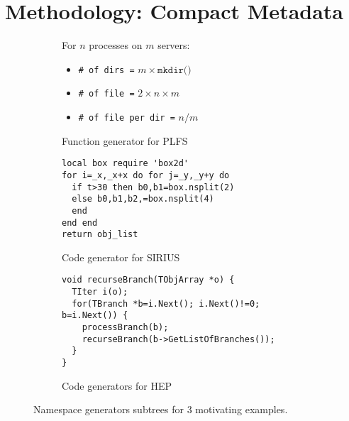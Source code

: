 \section{Methodology: Compact Metadata}


\begin{figure*}[tb]
  \centering
  \begin{subfigure}[b]{0.3\linewidth}
    For \(n\) processes on \(m\) servers:
    \begin{itemize}
      \setlength\itemsep{-0.5em}
      \item[] \texttt{\# of dirs =} \(m \times \texttt{mkdir()}\)
      \item[] \texttt{\# of file =} \(2 \times n \times m\)
      \item[] \texttt{\# of file per dir =} \(n/m\)
    \end{itemize}
    \caption{Function generator for PLFS\vspace{1em}} \label{fig:plfs}
  \end{subfigure}
  \begin{subfigure}[b]{0.3\linewidth}
      \footnotesize
      \begin{verbatim}
local box require 'box2d'
for i=_x,_x+x do for j=_y,_y+y do
  if t>30 then b0,b1=box.nsplit(2)
  else b0,b1,b2,=box.nsplit(4)
  end
end end 
return obj_list
     \end{verbatim}
      \caption{Code generator for SIRIUS\vspace{1em}} \label{fig:sirius}
  \end{subfigure}
  \begin{subfigure}[b]{0.35\linewidth}
      \centering
      \footnotesize
      \begin{verbatim}
void recurseBranch(TObjArray *o) {
  TIter i(o); 
  for(TBranch *b=i.Next(); i.Next()!=0; b=i.Next()) {
    processBranch(b);
    recurseBranch(b->GetListOfBranches());
  }
}
      \end{verbatim}
      \caption{Code generators for HEP\vspace{1em}} \label{fig:hep}
  \end{subfigure}
\caption{Namespace generators subtrees for 3 motivating examples.\label{fig:use-cases}}
\end{figure*}


